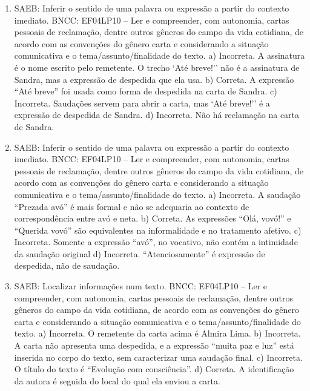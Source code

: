 \begin{enumerate}
\item
SAEB: Inferir o sentido de uma palavra ou expressão a partir do
contexto imediato.
BNCC: EF04LP10 -- Ler e compreender, com autonomia, cartas pessoais de
reclamação, dentre outros gêneros do campo da vida cotidiana, de acordo
com as convenções do gênero carta e considerando a situação comunicativa
e o tema/assunto/finalidade do texto.
a) Incorreta. A assinatura é o nome escrito pelo remetente. O trecho `Até 
breve!'' não é a assinatura de Sandra, mas a expressão de despedida que 
ela usa.
b) Correta. A expressão ``Até breve'' foi usada como forma de despedida 
na carta de Sandra.
c) Incorreta. Saudações servem para abrir a carta, mas `Até breve!'' é a 
expressão de despedida de Sandra.   
d) Incorreta. Não há reclamação na carta de Sandra.

\item
SAEB: Inferir o sentido de uma palavra ou expressão a partir do
contexto imediato.
BNCC: EF04LP10 -- Ler e compreender, com autonomia, cartas pessoais
de reclamação, dentre outros gêneros do campo da vida cotidiana, de
acordo com as convenções do gênero carta e considerando a situação
comunicativa e o tema/assunto/finalidade do texto.
a) Incorreta. A saudação ``Prezada avó'' é mais formal e não se adequaria
ao contexto de correspondência entre avó e neta.
b) Correta. As expressões ``Olá, vovó!'' e ``Querida vovó'' são 
equivalentes na informalidade e no tratamento afetivo. 
c) Incorreta. Somente a expressão ``avó'', no vocativo, não contém
a intimidade da saudação original
d) Incorreta. ``Atenciosamente'' é expressão de despedida, não de saudação.

\item
SAEB: Localizar informações num texto.
BNCC: EF04LP10 -- Ler e compreender, com autonomia, cartas pessoais de
reclamação, dentre outros gêneros do campo da vida cotidiana, de acordo
com as convenções do gênero carta e considerando a situação comunicativa
e o tema/assunto/finalidade do texto.
a) Incorreta. O remetente da carta acima é Almira Lima.
b)  Incorreta. A carta não apresenta uma despedida, e a expressão ``muita 
paz e luz'' está inserida no corpo do texto, sem caracterizar uma 
saudação final. 
c) Incorreta. O título do texto é ``Evolução com consciência''.
d) Correta. A identificação da autora é seguida do local do qual ela
enviou a carta.
\end{enumerate}


